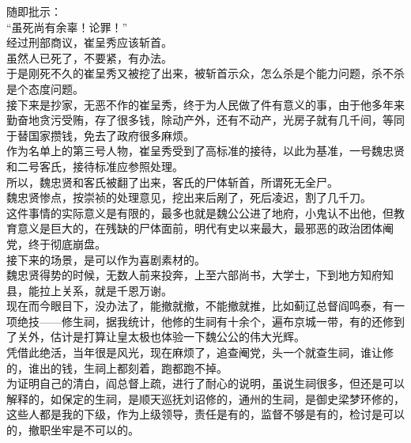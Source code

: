 \begin{multicols}{\theparacolNo}
随即批示：\\

“虽死尚有余辜！论罪！”\\

经过刑部商议，崔呈秀应该斩首。\\

虽然人已死了，不要紧，有办法。\\

于是刚死不久的崔呈秀又被挖了出来，被斩首示众，怎么杀是个能力问题，杀不杀是个态度问题。\\

接下来是抄家，无恶不作的崔呈秀，终于为人民做了件有意义的事，由于他多年来勤奋地贪污受贿，存了很多钱，除动产外，还有不动产，光房子就有几千间，等同于替国家攒钱，免去了政府很多麻烦。\\

作为名单上的第三号人物，崔呈秀受到了高标准的接待，以此为基准，一号魏忠贤和二号客氏，接待标准应参照处理。\\

所以，魏忠贤和客氏被翻了出来，客氏的尸体斩首，所谓死无全尸。\\

魏忠贤惨点，按崇祯的处理意见，挖出来后剐了，死后凌迟，割了几千刀。\\

这件事情的实际意义是有限的，最多也就是魏公公进了地府，小鬼认不出他，但教育意义是巨大的，在残缺的尸体面前，明代有史以来最大，最邪恶的政治团体阉党，终于彻底崩盘。\\

接下来的场景，是可以作为喜剧素材的。\\

魏忠贤得势的时候，无数人前来投奔，上至六部尚书，大学士，下到地方知府知县，能拉上关系，就是千恩万谢。\\

现在而今眼目下，没办法了，能撤就撤，不能撤就推，比如蓟辽总督阎鸣泰，有一项绝技——修生祠，据我统计，他修的生祠有十余个，遍布京城一带，有的还修到了关外，估计是打算让皇太极也体验一下魏公公的伟大光辉。\\

凭借此绝活，当年很是风光，现在麻烦了，追查阉党，头一个就查生祠，谁让修的，谁出的钱，生祠上都刻着，跑都跑不掉。\\

为证明自己的清白，阎总督上疏，进行了耐心的说明，虽说生祠很多，但还是可以解释的，如保定的生祠，是顺天巡抚刘诏修的，通州的生祠，是御史梁梦环修的，这些人都是我的下级，作为上级领导，责任是有的，监督不够是有的，检讨是可以的，撤职坐牢是不可以的。\\


\end{multicols}
